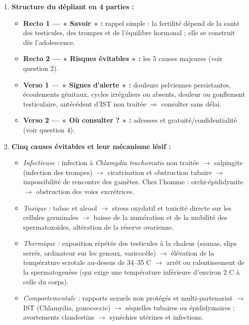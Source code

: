 \documentclass[11pt]{article}
\begin{document}
\begin{corrige}
\begin{enumerate}
    \item \textbf{Structure du dépliant en 4 parties :}
    \begin{itemize}
        \item \textbf{Recto 1 — « Savoir » :} rappel simple : la fertilité dépend de la santé des testicules, des trompes et de l'équilibre hormonal ; elle se construit dès l'adolescence.
        \item \textbf{Recto 2 — « Risques évitables » :} les 5 causes majeures (voir question 2).
        \item \textbf{Verso 1 — « Signes d'alerte » :} douleurs pelviennes persistantes, écoulements génitaux, cycles irréguliers ou absents, douleur ou gonflement testiculaire, antécédent d'IST non traitée $\Rightarrow$ consulter sans délai.
        \item \textbf{Verso 2 — « Où consulter ? » :} adresses et gratuité/confidentialité (voir question 4).
    \end{itemize}
    \item \textbf{Cinq causes évitables et leur mécanisme lésif :}
    \begin{itemize}
        \item \emph{Infectieuse :} infection à \emph{Chlamydia trachomatis} non traitée $\rightarrow$ salpingite (infection des trompes) $\rightarrow$ cicatrisation et obstruction tubaire $\rightarrow$ impossibilité de rencontre des gamètes. Chez l'homme : orchi-épididymite $\rightarrow$ obstruction des voies excrétrices.
        \item \emph{Toxique :} tabac et alcool $\rightarrow$ stress oxydatif et toxicité directe sur les cellules germinales $\rightarrow$ baisse de la numération et de la mobilité des spermatozoïdes, altération de la réserve ovarienne.
        \item \emph{Thermique :} exposition répétée des testicules à la chaleur (saunas, slips serrés, ordinateur sur les genoux, varicocèle) $\rightarrow$ élévation de la température scrotale au-dessus de 34--35 \degre C $\rightarrow$ arrêt ou ralentissement de la spermatogenèse (qui exige une température inférieure d'environ 2 \degre C à celle du corps).
        \item \emph{Comportementale :} rapports sexuels non protégés et multi-partenariat $\rightarrow$ IST (Chlamydia, gonococcie) $\rightarrow$ séquelles tubaires ou épididymaires ; avortements clandestins $\rightarrow$ synéchies utérines et infections.

\end{itemize}
\end{enumerate}
\end{corrige}
\end{document}
